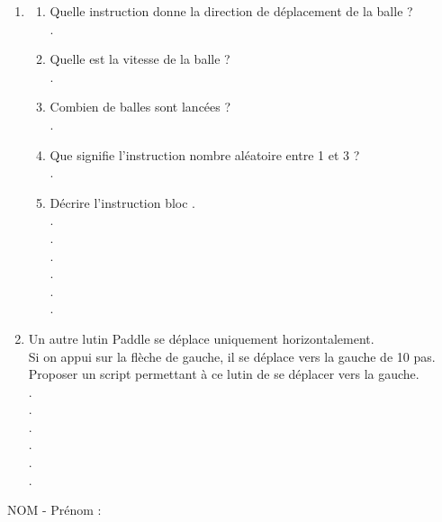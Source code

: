 \documentclass[12pt,a4paper]{article}
\begin{document}
\begin{enumerate}[1{)}]
\item
\begin{enumerate}[a{)}]
\item
Quelle instruction donne la direction de déplacement de la balle ? \vspace{6pt} \\
.\dotfill \vspace{9pt}
\item
Quelle est la vitesse de la balle ? \vspace{6pt} \\
.\dotfill \vspace{9pt}
\item
Combien de balles sont lancées ? \vspace{6pt} \\
.\dotfill \vspace{9pt}
\item
Que signifie l'instruction \og nombre aléatoire entre 1 et 3 \fg{} ? \vspace{6pt} \\
.\dotfill \vspace{9pt}
\item
Décrire l'instruction \og bloc \fg{}. \vspace{6pt} \\
.\dotfill \vspace{6pt} \\
.\dotfill \vspace{6pt} \\
.\dotfill \vspace{6pt} \\
.\dotfill \vspace{6pt} \\
.\dotfill \vspace{6pt} \\
.\dotfill \vspace{9pt}
\end{enumerate}
\item
Un autre lutin \og Paddle \fg{} se déplace uniquement horizontalement. \vspace{3pt} \\
Si on appui sur la flèche de gauche, il se déplace vers la gauche de 10 pas. \vspace{3pt} \\
Proposer un script permettant à ce lutin de se déplacer vers la gauche. \vspace{6pt} \\
.\dotfill \vspace{6pt} \\
.\dotfill \vspace{6pt} \\
.\dotfill \vspace{6pt} \\
.\dotfill \vspace{6pt} \\
.\dotfill \vspace{6pt} \\
.\dotfill 
\end{enumerate}
\vfill
NOM - Prénom : \dotfill 
\end{document}
